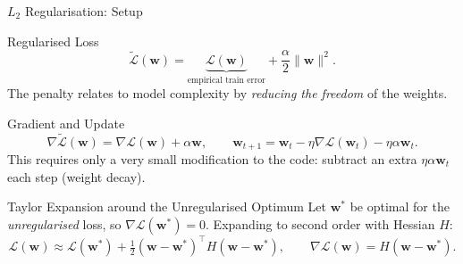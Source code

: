 \documentclass{beamer}
\begin{document}
\begin{frame}[shrink=10]{$L_2$ Regularisation: Setup}
  \begin{block}{Regularised Loss}
    \[
      \widetilde{\mathcal L}(\mathbf{w})
        = \underbrace{\mathcal L(\mathbf{w})}_{\text{empirical train error}}
          + \frac{\alpha}{2}\|\mathbf{w}\|^2 .
    \]
    The penalty relates to model complexity by \emph{reducing the freedom}
    of the weights.
  \end{block}

  \begin{block}{Gradient and Update}
    \[
      \nabla\widetilde{\mathcal L}(\mathbf{w}) = \nabla\mathcal L(\mathbf{w}) + \alpha\mathbf{w},
      \qquad
      \mathbf{w}_{t+1} = \mathbf{w}_t - \eta\nabla\mathcal L(\mathbf{w}_t) - \eta\alpha\mathbf{w}_t.
    \]
    This requires only a very small modification to the code: subtract an
    extra $\eta\alpha\mathbf{w}_t$ each step (weight decay).
  \end{block}

  \begin{block}{Taylor Expansion around the Unregularised Optimum}
    Let $\mathbf{w}^{*}$ be optimal for the \emph{unregularised} loss, so
    $\nabla\mathcal L(\mathbf{w}^{*}) = 0$. Expanding to second order with
    Hessian $H$:
    \[
      \mathcal L(\mathbf{w}) \approx \mathcal L(\mathbf{w}^{*})
        + \tfrac12(\mathbf{w}-\mathbf{w}^{*})^{\top}H(\mathbf{w}-\mathbf{w}^{*}),
      \qquad
      \nabla\mathcal L(\mathbf{w}) = H(\mathbf{w}-\mathbf{w}^{*}).
    \]
  \end{block}
\end{frame}
\end{document}
